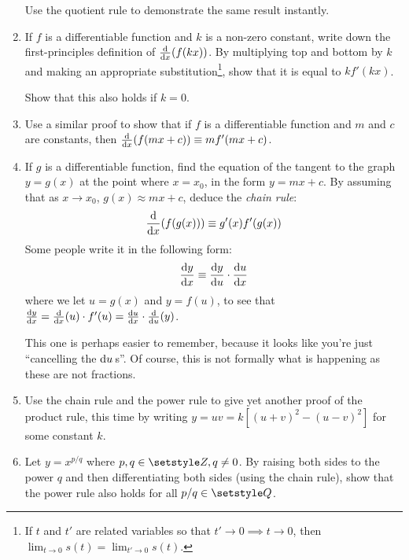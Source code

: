 \begin{enumerate}
  Use the quotient rule to demonstrate the same result instantly.
 \item
  If \(f\) is a differentiable function and \(k\) is a non-zero constant,
  write down the first-principles definition of \(\dv{x}(f(kx))\). By
  multiplying top and bottom by \(k\) and making an appropriate
  substitution\footnote{
   If \(t\) and \(t'\) are related variables so that
   \(t' \to 0 \implies t \to 0\), then
   \(\lim_{t \to 0} s(t) = \lim_{t' \to 0} s(t)\).
  }, show that it is equal to \(kf'(kx)\).

  Show that this also holds if \(k = 0\).
 \item
  Use a similar proof to show that if \(f\) is a differentiable function and
  \(m\) and \(c\) are constants, then \(\dv{x}(f(mx + c)) \equiv mf'(mx + c)\).
 \item
  If \(g\) is a differentiable function, find the equation of the tangent to the
  graph \(y = g(x)\) at the point where \(x = x_0\), in the form
  \(y = mx + c\). By assuming that as \(x \to x_0\), \(g(x) \approx mx + c\),
  deduce the \emph{chain rule}:
  \begin{equation*}
   \dv{x}(f(g(x))) \equiv g'(x) f'(g(x))
  \end{equation*}
  Some people write it in the following form:
  \begin{equation*}
   \dv<y>{x} \equiv \dv<y>{u} \cdot \dv<u>{x}
  \end{equation*}
  where we let \(u = g(x)\) and \(y = f(u)\), to see that
  \(\dv<y>{x}
    = \dv{x}(u) \cdot f'(u)
    = \dv<u>{x} \cdot \dv{u}(y)\).

  This one is perhaps easier to remember, because it looks like you're just
  ``cancelling the \(\mathrm d u\,\)s''. Of course, this is not formally what is
  happening as these are not fractions.
 \item
  Use the chain rule and the power rule to give yet another proof of the product
  rule, this time by writing \(y = uv = k[(u + v)^2 - (u - v)^2]\) for some
  constant \(k\).
 \item
  Let \(y = x^{p/q}\) where \(p, q \in \Integers, q \ne 0\). By raising both
  sides to the power \(q\) and then differentiating both sides (using the chain
  rule), show that the power rule also holds for all \(p / q \in \Rationals\).


\end{enumerate}
